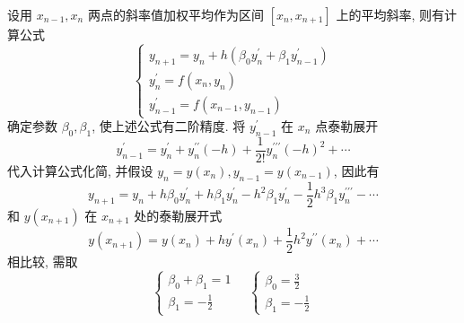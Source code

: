     \begin{tcolorbox}[enhanced,colback=8,colframe=7,breakable,coltitle=green!25!black,title=2024]
设用 $ x_{n-1}, x_{n} $ 两点的斜率值加权平均作为区间 $ \left[x_{n}, x_{n+1}\right] $ 上的平均斜率, 则有计算公式
$$
\left\{\begin{array}{l}
y_{n+1}=y_{n}+h\left(\beta_{0} y_{n}^{\prime}+\beta_{1} y_{n-1}^{\prime}\right) \\
y_{n}^{\prime}=f\left(x_{n}, y_{n}\right) \\
y_{n-1}^{\prime}=f\left(x_{n-1}, y_{n-1}\right)
\end{array}\right.
$$
确定参数 $ \beta_{0}, \beta_{1} $, 使上述公式有二阶精度.
 \tcblower
将 $ y_{n-1}^{\prime} $ 在 $ x_{n} $ 点泰勒展开
$$
y_{n-1}^{\prime}=y_{n}^{\prime}+y_{n}^{\prime \prime}(-h)+\frac{1}{2!} y_{n}^{\prime \prime \prime}(-h)^{2}+\cdots
$$
代入计算公式化简, 并假设 $ y_{n}=y\left(x_{n}\right), y_{n-1}=y\left(x_{n-1}\right) $, 因此有
$$
y_{n+1}=y_{n}+h \beta_{0} y_{n}^{\prime}+h \beta_{1} y_{n}^{\prime}-h^{2} \beta_{1} y_{n}^{\prime}-\frac{1}{2} h^{3} \beta_{1} y_{n}^{\prime \prime \prime}-\cdots
$$
和 $ y\left(x_{n+1}\right) $ 在 $ x_{n+1} $ 处的泰勒展开式
$$
y\left(x_{n+1}\right)=y\left(x_{n}\right)+h y^{\prime}\left(x_{n}\right)+\frac{1}{2} h^{2} y^{\prime \prime}\left(x_{n}\right)+\cdots
$$
相比较, 需取
$$
\left\{\begin{array} { l } 
{ \beta _ { 0 } + \beta _ { 1 } = 1 } \\
{ \beta _ { 1 } = - \frac { 1 } { 2 } }
\end{array} \quad \left\{\begin{array}{l}
\beta_{0}=\frac{3}{2} \\
\beta_{1}=-\frac{1}{2}
\end{array}\right.\right.
$$
 \end{tcolorbox}

